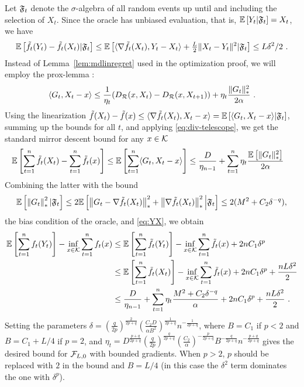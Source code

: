 Let $\mathfrak{F}_t$ denote the $\sigma$-algebra of all random events up until and including the selection of $X_t$. Since the oracle has unbiased evaluation, that is,  $\mathbb{E}\left[Y_t|\mathfrak{F}_t\right]=X_t$, we have
\begin{equation}
\mathbb{E}\left[\tilde{f}_t(Y_t)-\tilde{f}_t(X_t)|\mathfrak{F}_t\right] \le \mathbb{E}\left[\langle \nabla \tilde{f}_t(X_t),Y_t-X_t \rangle+\tfrac{L}{2}\|X_t-Y_t\|^2|\mathfrak{F}_t\right] \le L\delta^2/2~.
\label{eq:YX}
\end{equation}
Instead of Lemma~\ref{lem:mdlinregret} used in the optimization proof, we will employ the prox-lemma \citep[see, e.g.,][]{Beck2003mirror, NeJuLaSh09}:
\begin{equation}
\label{eq:proxlemma}
\langle G_t,X_t-x \rangle \le \frac{1}{\eta_t}(D_{\mathcal{R}}(x,X_t)-D_{\mathcal{R}}(x,X_{t+1})) + \eta_t \frac{\|G_t\|_*^2}{2\alpha}~.
\end{equation}
Using the linearization $\tilde{f}(X_t) - \tilde{f}(x) \le \langle \nabla \tilde{f}_t(X_t),X_t-x \rangle = \mathbb{E}\left[\langle  G_t,X_t-x \rangle| \mathfrak{F}_t\right]$, summing up the bounds for all $t$, and applying \eqref{eq:div-telescope}, we get the standard mirror descent bound for any $x \in \mathcal{K}$
\begin{align}
\mathbb{E}\left[\sum_{t=1}^n \tilde{f}_t(X_t)- \sum_{t=1}^n \tilde{f}_t(x)\right] 
& \le \mathbb{E}\left[\sum_{t=1}^n \langle G_t,X_t-x \rangle\right] 
\le \frac{D}{\eta_{n-1}} + \sum_{t=1}^n \eta_t \frac{\mathbb{E}\left[\|G_t\|_*^2\right]}{2\alpha} 
\label{eq:md-bound}
\end{align}
Combining the latter with the bound
\[
\mathbb{E}\left[\left\|G_t\right\|_*^2 | \mathfrak{F}_t\right] \le 2\mathbb{E}\left[\left\|G_t - \nabla \tilde{f}_t(X_t)\right\|_*^2 + \left\|\nabla \tilde{f}_t(X_t)\right\|_*^2 \Big| \mathfrak{F}_t\right]
\le 2(M^2 + C_2 \delta^{-q}),
\]
the bias condition of the oracle, and \eqref{eq:YX}, we obtain
\begin{align*}
\mathbb{E}\left[\sum_{t=1}^n f_t(Y_t)\right] - \inf_{x \in \mathcal{K}} \sum_{t=1}^n f_t(x)
& \le \mathbb{E}\left[\sum_{t=1}^n \tilde{f}_t(Y_t) \right]- \inf_{x \in \mathcal{K}} \sum_{t=1}^n \tilde{f}_t(x) + 2 n C_1 \delta^{p} \\
& \le \mathbb{E}\left[\sum_{t=1}^n \tilde{f}_t(X_t)\right] - \inf_{x \in \mathcal{K}} \sum_{t=1}^n \tilde{f}_t(x) + 2 n C_1 \delta^{p} + \frac{n L \delta^2}{2} \\
& \le \frac{D}{\eta_{n-1}}  + \sum_{t=1}^n \eta_t \frac{M^2 + C_2 \delta^{-q}}{\alpha} +  2 n C_1 \delta^{p} + \frac{n L \delta^2}{2}~.
\end{align*}
Setting the parameters 
$\delta=(\frac{q}{2p})^{\frac{2}{2p+q}} (\frac{C_2 D}{\alpha B^2})^{\frac{1}{2p+q}} n^{-\frac{1}{2p+q}}$, 
where $B=C_1$ if $p<2$ and $B=C_1+L/4$ if $p=2$, and 
$\eta_t=D^{\frac{p+q}{2p+q}} (\frac{q}{2p})^{\frac{q}{2p+q}} (\frac{C_2}{\alpha})^{-\frac{p}{2p+q}} B^{-\frac{q}{2p+q}} n^{-\frac{p+q}{2p+q}}$ gives the desired bound for $\mathcal{F}_{L,0}$ with bounded gradients. When $p>2$, $p$ should be replaced with $2$ in the bound and $B=L/4$ (in this case the $\delta^2$ term dominates the one with $\delta^p$).


